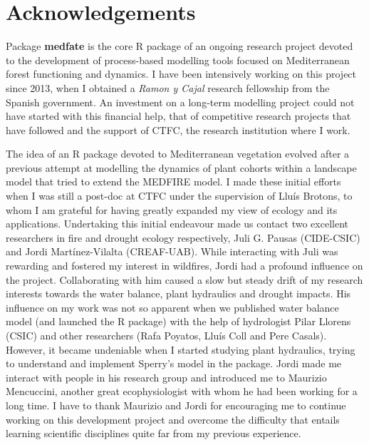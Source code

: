 \documentclass[]{book}
\begin{document}
\section*{Acknowledgements}\label{acknowledgements}

Package \textbf{medfate} is the core R package of an ongoing research
project devoted to the development of process-based modelling tools
focused on Mediterranean forest functioning and dynamics. I have been
intensively working on this project since 2013, when I obtained a
\emph{Ramon y Cajal} research fellowship from the Spanish government. An
investment on a long-term modelling project could not have started with
this financial help, that of competitive research projects that have
followed and the support of CTFC, the research institution where I work.

The idea of an R package devoted to Mediterranean vegetation evolved
after a previous attempt at modelling the dynamics of plant cohorts
within a landscape model that tried to extend the MEDFIRE model. I made
these initial efforts when I was still a post-doc at CTFC under the
supervision of Lluís Brotons, to whom I am grateful for having greatly
expanded my view of ecology and its applications. Undertaking this
initial endeavour made us contact two excellent researchers in fire and
drought ecology respectively, Juli G. Pausas (CIDE-CSIC) and Jordi
Martínez-Vilalta (CREAF-UAB). While interacting with Juli was rewarding
and fostered my interest in wildfires, Jordi had a profound influence on
the project. Collaborating with him caused a slow but steady drift of my
research interests towards the water balance, plant hydraulics and
drought impacts. His influence on my work was not so apparent when we
published water balance model (and launched the R package) with the help
of hydrologist Pilar Llorens (CSIC) and other researchers (Rafa Poyatos,
Lluís Coll and Pere Casals). However, it became undeniable when I
started studying plant hydraulics, trying to understand and implement
Sperry's model in the package. Jordi made me interact with people in his
research group and introduced me to Maurizio Mencuccini, another great
ecophysiologist with whom he had been working for a long time. I have to
thank Maurizio and Jordi for encouraging me to continue working on this
development project and overcome the difficulty that entails learning
scientific disciplines quite far from my previous experience.
\end{document}
